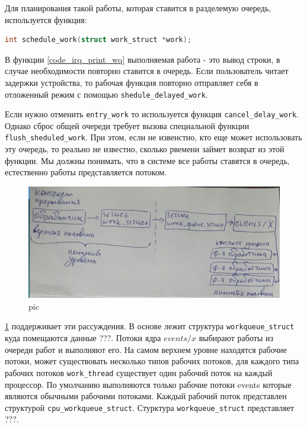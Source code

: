 Для планирования такой работы, которая ставится в разделемую очередь, используется функция:
\begin{lstlisting}[language=c]
int schedule_work(struct work_struct *work);
\end{lstlisting}

 

В функции \ref{code_irq_print_wq} выполняемая работа - это вывод строки, в случае необходимости повторно ставится в очередь. Если пользователь читает задержки устройства, то рабочая функция повторно отправляет себя в отложенный режим с помощью \verb|shedule_delayed_work|.

Если нужно отменить \verb|entry_work| то используется функция \verb|cancel_delay_work|. Однако сброс общей очереди требует вызова специальной функции \verb|flush_sheduled_work|. При этом, если не извенстно, кто еще может использовать эту очередь, то реально не известно, сколько рвемени займет возврат из этой функции. Мы должны понимать, что в системе все работы ставятся в очередь, естественно работы представляется потоком. 

\begin{figure}[H]
  \centering
  \includegraphics[width=\textwidth]{pic/1.png}
  \caption{pic}
  \label{pic_run_queue_work}
\end{figure}

\ref{pic_run_queue_work} поддерживает эти рассуждения. В основе лежит структура \verb|workqueue_struct| куда помещаются данные ???. Потоки ядра $events/x$ выбирают работы из очереди работ и выполняют его. На самом верхнем уровне находятся рабочие потоки, может существовать несколько типов рабочих потоков, для каждого типа рабочих потоков \verb|work_thread| существует один рабочий поток на каждый процессор. По умолчанию выполняются только рабочие потоки events которые являются обычными рабочими потоками. Каждый рабочий поток представлен структурой \verb|cpu_workqueue_struct|. Стурктура \verb|workqueue_struct| представляет ???.

